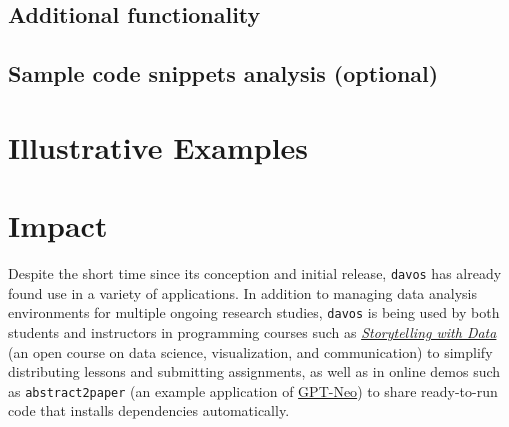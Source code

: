 \documentclass[preprint,12pt, a4paper]{elsarticle}
\begin{document}
\subsection{Additional functionality}



\subsection{Sample code snippets analysis (optional)}


\section{Illustrative Examples}



\section{Impact}

Despite the short time since its conception and initial release, \texttt{davos} has already found use in a variety of applications.
In addition to managing data analysis environments for multiple ongoing research studies, \texttt{davos} is being used by both students and instructors in programming courses such as \href{https://github.com/ContextLab/storytelling-with-data}{\textit{Storytelling with Data}} \cite{Mann21b} (an open course on data science, visualization, and communication) to simplify distributing lessons and submitting assignments, as well as in online demos such as {\texttt{abstract2paper}} \cite{Mann21a} (an example application of \href{https://github.com/EleutherAI/gpt-neo}{GPT-Neo}) to share ready-to-run code that installs dependencies automatically.
\end{document}

